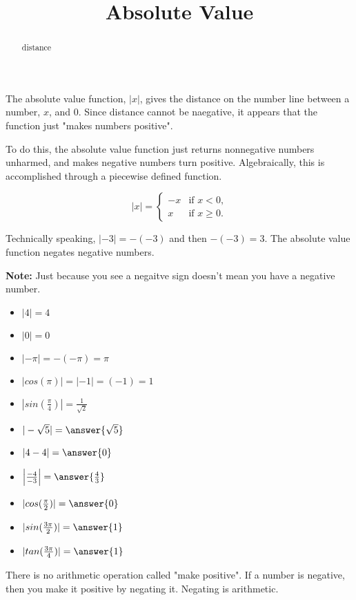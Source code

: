 \documentclass{ximera}
\title{Absolute Value}
\begin{document}
\begin{abstract}
distance
\end{abstract}
\maketitle



The absolute value function, $|x|$, gives the distance on the number line between a number, $x$, and $0$.  Since distance cannot be naegative, it appears that the function just "makes numbers positive".


To do this, the absolute value function just returns nonnegative numbers unharmed, and makes negative numbers turn positive.  Algebraically, this is accomplished through a piecewise defined function.






\[
|x| = 
\begin{cases}
  -x &\text{if $x<0$,}\\
  x & \text{if $x\ge 0$}.
\end{cases}
\]


Technically speaking, $|-3| = -(-3)$ and then $-(-3) = 3$.  The absolute value function negates negative numbers.


\textbf{Note:} Just because you see a negaitve sign doesn't mean you have a negative number.



\begin{example}
\begin{itemize}
\item $|4| = 4$
\item $|0| = 0$
\item $|-\pi| = -(-\pi) = \pi$
\item $|cos(\pi)| = |-1| = (-1) = 1$
\item $|sin(\tfrac{\pi}{4})| = \tfrac{1}{\sqrt{2}}$
\end{itemize}
\end{example}





\begin{example}
\begin{itemize}
\item $|-\sqrt{5}| = \answer{\sqrt{5}}$
\item $|4-4| = \answer{0}$
\item $\left|\frac{-4}{-3}\right| = \answer{\frac{4}{3}}$
\item $|cos(\tfrac{\pi}{2})| = \answer{0}$
\item $|sin(\tfrac{3\pi}{2})| = \answer{1}$
\item $|tan(\tfrac{3\pi}{4})| = \answer{1}$
\end{itemize}
\end{example}
There is no arithmetic operation called "make positive".  If a number is negative, then you make it positive by negating it. Negating is arithmetic.
\end{document}
